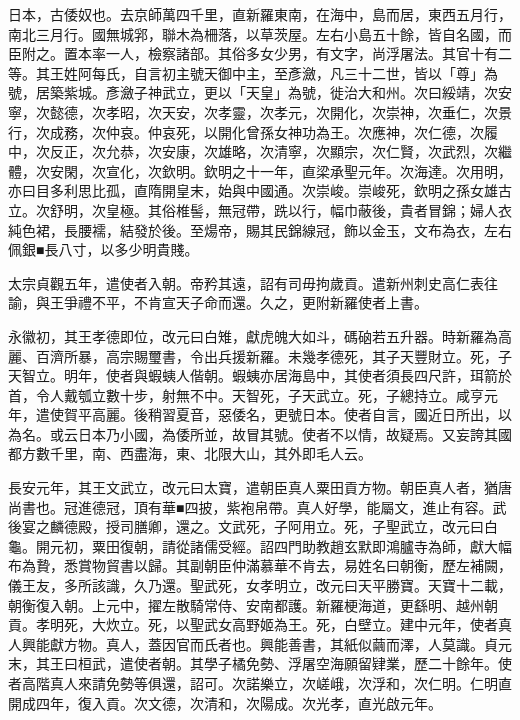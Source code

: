 \begin{pinyinscope}
 日本，古倭奴也。去京師萬四千里，直新羅東南，在海中，島而居，東西五月行，南北三月行。國無城郛，聯木為柵落，以草茨屋。左右小島五十餘，皆自名國，而臣附之。置本率一人，檢察諸部。其俗多女少男，有文字，尚浮屠法。其官十有二等。其王姓阿每氏，自言初主號天御中主，至彥瀲，凡三十二世，皆以「尊」為號，居築紫城。彥瀲子神武立，更以「天皇」為號，徙治大和州。次曰綏靖，次安寧，次懿德，次孝昭，次天安，次孝靈，次孝元，次開化，次崇神，次垂仁，次景行，次成務，次仲哀。仲哀死，以開化曾孫女神功為王。次應神，次仁德，次履中，次反正，次允恭，次安康，次雄略，次清寧，次顯宗，次仁賢，次武烈，次繼體，次安閑，次宣化，次欽明。欽明之十一年，直梁承聖元年。次海達。次用明，亦曰目多利思比孤，直隋開皇末，始與中國通。次崇峻。崇峻死，欽明之孫女雄古立。次舒明，次皇極。其俗椎髻，無冠帶，跣以行，幅巾蔽後，貴者冒錦；婦人衣純色裙，長腰襦，結發於後。至煬帝，賜其民錦線冠，飾以金玉，文布為衣，左右佩銀■長八寸，以多少明貴賤。



 太宗貞觀五年，遣使者入朝。帝矜其遠，詔有司毋拘歲貢。遣新州刺史高仁表往諭，與王爭禮不平，不肯宣天子命而還。久之，更附新羅使者上書。



 永徽初，其王孝德即位，改元曰白雉，獻虎魄大如斗，碼硇若五升器。時新羅為高麗、百濟所暴，高宗賜璽書，令出兵援新羅。未幾孝德死，其子天豐財立。死，子天智立。明年，使者與蝦蛦人偕朝。蝦蛦亦居海島中，其使者須長四尺許，珥箭於首，令人戴瓠立數十步，射無不中。天智死，子天武立。死，子總持立。咸亨元年，遣使賀平高麗。後稍習夏音，惡倭名，更號日本。使者自言，國近日所出，以為名。或云日本乃小國，為倭所並，故冒其號。使者不以情，故疑焉。又妄誇其國都方數千里，南、西盡海，東、北限大山，其外即毛人云。



 長安元年，其王文武立，改元曰太寶，遣朝臣真人粟田貢方物。朝臣真人者，猶唐尚書也。冠進德冠，頂有華■四披，紫袍帛帶。真人好學，能屬文，進止有容。武後宴之麟德殿，授司膳卿，還之。文武死，子阿用立。死，子聖武立，改元曰白龜。開元初，粟田復朝，請從諸儒受經。詔四門助教趙玄默即鴻臚寺為師，獻大幅布為贄，悉賞物貿書以歸。其副朝臣仲滿慕華不肯去，易姓名曰朝衡，歷左補闕，儀王友，多所該識，久乃還。聖武死，女孝明立，改元曰天平勝寶。天寶十二載，朝衡復入朝。上元中，擢左散騎常侍、安南都護。新羅梗海道，更繇明、越州朝貢。孝明死，大炊立。死，以聖武女高野姬為王。死，白壁立。建中元年，使者真人興能獻方物。真人，蓋因官而氏者也。興能善書，其紙似繭而澤，人莫識。貞元末，其王曰桓武，遣使者朝。其學子橘免勢、浮屠空海願留肄業，歷二十餘年。使者高階真人來請免勢等俱還，詔可。次諾樂立，次嵯峨，次浮和，次仁明。仁明直開成四年，復入貢。次文德，次清和，次陽成。次光孝，直光啟元年。




\end{pinyinscope}
